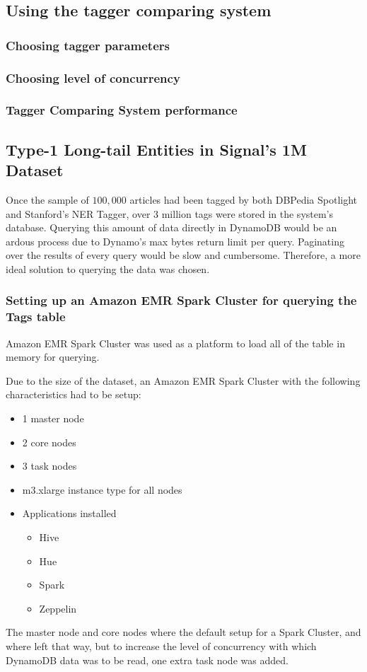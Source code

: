 \subsection{Using the tagger comparing system}\label{TaggingSignal}

\subsubsection{Choosing tagger parameters}

\subsubsection{Choosing level of concurrency}

\subsubsection{Tagger Comparing System performance}

\subsection{Type-1 Long-tail Entities in Signal's 1M Dataset} \label{ResultsSignal}
Once the sample of $100,000$ articles had been tagged by both DBPedia Spotlight and Stanford's NER Tagger,
over 3 million tags were stored in the system's database.
Querying this amount of data directly in DynamoDB would be an ardous process due to Dynamo's max bytes return limit per query.
Paginating over the results of every query would be slow and cumbersome.
Therefore, a more ideal solution to querying the data was chosen.

\subsubsection{Setting up an Amazon EMR Spark Cluster for querying the Tags table}
Amazon EMR Spark Cluster  was used as a platform to load all of the table in memory for querying.

Due to the size of the dataset, an Amazon EMR Spark Cluster with the following characteristics had to be setup:
\begin{itemize}
  \item 1 master node
  \item 2 core nodes
  \item 3 task nodes
  \item m3.xlarge instance type for all nodes
  \item Applications installed
    \begin{itemize}
      \item Hive
      \item Hue
      \item Spark
      \item Zeppelin
    \end{itemize}
\end{itemize}
The master node and core nodes where the default setup for a Spark Cluster, and where left that way,
but to increase the level of concurrency with which DynamoDB data was to be read, one extra task node was added.

